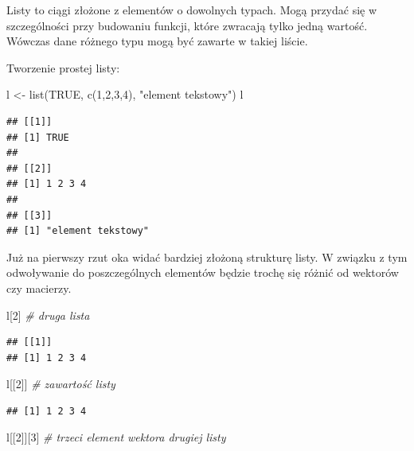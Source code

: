 \documentclass[
]{book}
\newenvironment{Shaded}{\begin{snugshade}}{\end{snugshade}}
\newcommand{\CommentTok}[1]{\textcolor[rgb]{0.56,0.35,0.01}{\textit{#1}}}
\newcommand{\ConstantTok}[1]{\textcolor[rgb]{0.00,0.00,0.00}{#1}}
\newcommand{\DecValTok}[1]{\textcolor[rgb]{0.00,0.00,0.81}{#1}}
\newcommand{\FunctionTok}[1]{\textcolor[rgb]{0.00,0.00,0.00}{#1}}
\newcommand{\NormalTok}[1]{#1}
\newcommand{\OtherTok}[1]{\textcolor[rgb]{0.56,0.35,0.01}{#1}}
\newcommand{\StringTok}[1]{\textcolor[rgb]{0.31,0.60,0.02}{#1}}
\begin{document}
Listy to ciągi złożone z elementów o dowolnych typach. Mogą przydać się w szczególności przy budowaniu funkcji, które zwracają tylko jedną wartość. Wówczas dane różnego typu mogą być zawarte w takiej liście.

Tworzenie prostej listy:

\begin{Shaded}
\begin{Highlighting}[]
\NormalTok{l }\OtherTok{\textless{}{-}} \FunctionTok{list}\NormalTok{(}\ConstantTok{TRUE}\NormalTok{, }\FunctionTok{c}\NormalTok{(}\DecValTok{1}\NormalTok{,}\DecValTok{2}\NormalTok{,}\DecValTok{3}\NormalTok{,}\DecValTok{4}\NormalTok{), }\StringTok{"element tekstowy"}\NormalTok{)}
\NormalTok{l}
\end{Highlighting}
\end{Shaded}

\begin{verbatim}
## [[1]]
## [1] TRUE
## 
## [[2]]
## [1] 1 2 3 4
## 
## [[3]]
## [1] "element tekstowy"
\end{verbatim}

Już na pierwszy rzut oka widać bardziej złożoną strukturę listy. W związku z tym odwoływanie do poszczególnych elementów będzie trochę się różnić od wektorów czy macierzy.

\begin{Shaded}
\begin{Highlighting}[]
\NormalTok{l[}\DecValTok{2}\NormalTok{] }\CommentTok{\# druga lista}
\end{Highlighting}
\end{Shaded}

\begin{verbatim}
## [[1]]
## [1] 1 2 3 4
\end{verbatim}

\begin{Shaded}
\begin{Highlighting}[]
\NormalTok{l[[}\DecValTok{2}\NormalTok{]] }\CommentTok{\# zawartość listy}
\end{Highlighting}
\end{Shaded}

\begin{verbatim}
## [1] 1 2 3 4
\end{verbatim}

\begin{Shaded}
\begin{Highlighting}[]
\NormalTok{l[[}\DecValTok{2}\NormalTok{]][}\DecValTok{3}\NormalTok{] }\CommentTok{\# trzeci element wektora drugiej listy}
\end{Highlighting}
\end{Shaded}
\end{document}
